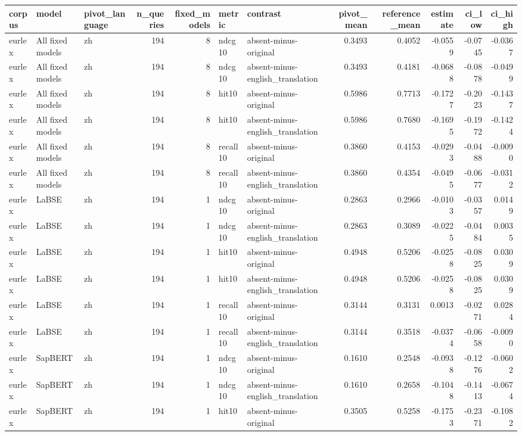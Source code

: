 \begin{tabular}{lllrrllrrrrr}
\toprule
corpus & model & pivot\_language & n\_queries & fixed\_models & metric & contrast & pivot\_mean & reference\_mean & estimate & ci\_low & ci\_high \\
\midrule
eurlex & All fixed models & zh & 194 & 8 & ndcg10 & absent-minus-original & 0.3493 & 0.4052 & -0.0559 & -0.0745 & -0.0367 \\
eurlex & All fixed models & zh & 194 & 8 & ndcg10 & absent-minus-english\_translation & 0.3493 & 0.4181 & -0.0688 & -0.0878 & -0.0499 \\
eurlex & All fixed models & zh & 194 & 8 & hit10 & absent-minus-original & 0.5986 & 0.7713 & -0.1727 & -0.2023 & -0.1437 \\
eurlex & All fixed models & zh & 194 & 8 & hit10 & absent-minus-english\_translation & 0.5986 & 0.7680 & -0.1695 & -0.1972 & -0.1424 \\
eurlex & All fixed models & zh & 194 & 8 & recall10 & absent-minus-original & 0.3860 & 0.4153 & -0.0293 & -0.0488 & -0.0090 \\
eurlex & All fixed models & zh & 194 & 8 & recall10 & absent-minus-english\_translation & 0.3860 & 0.4354 & -0.0495 & -0.0677 & -0.0312 \\
eurlex & LaBSE & zh & 194 & 1 & ndcg10 & absent-minus-original & 0.2863 & 0.2966 & -0.0103 & -0.0357 & 0.0149 \\
eurlex & LaBSE & zh & 194 & 1 & ndcg10 & absent-minus-english\_translation & 0.2863 & 0.3089 & -0.0225 & -0.0484 & 0.0035 \\
eurlex & LaBSE & zh & 194 & 1 & hit10 & absent-minus-original & 0.4948 & 0.5206 & -0.0258 & -0.0825 & 0.0309 \\
eurlex & LaBSE & zh & 194 & 1 & hit10 & absent-minus-english\_translation & 0.4948 & 0.5206 & -0.0258 & -0.0825 & 0.0309 \\
eurlex & LaBSE & zh & 194 & 1 & recall10 & absent-minus-original & 0.3144 & 0.3131 & 0.0013 & -0.0271 & 0.0284 \\
eurlex & LaBSE & zh & 194 & 1 & recall10 & absent-minus-english\_translation & 0.3144 & 0.3518 & -0.0374 & -0.0658 & -0.0090 \\
eurlex & SapBERT & zh & 194 & 1 & ndcg10 & absent-minus-original & 0.1610 & 0.2548 & -0.0938 & -0.1276 & -0.0602 \\
eurlex & SapBERT & zh & 194 & 1 & ndcg10 & absent-minus-english\_translation & 0.1610 & 0.2658 & -0.1048 & -0.1413 & -0.0674 \\
eurlex & SapBERT & zh & 194 & 1 & hit10 & absent-minus-original & 0.3505 & 0.5258 & -0.1753 & -0.2371 & -0.1082 \\

\end{tabular}
